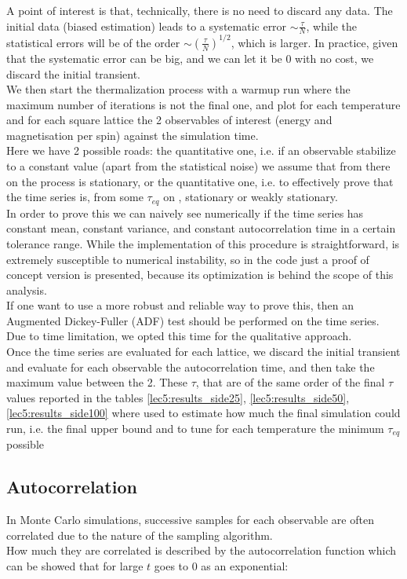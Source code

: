 A point of interest is that, technically, there is no need to discard any data. The initial data (biased estimation) leads to a systematic error $\sim \frac{\tau}{N}$,
while the statistical errors will be of the order $\sim (\frac{\tau}{N})^{1/2}$, which is larger. In practice, given that the systematic error can be big, 
and we can let it be 0 with no cost, we discard the initial transient. \\ 

We then start the thermalization process with a warmup run where the maximum number of iterations is not the final one, and plot for each temperature and for 
each square lattice the 2 observables of interest (energy and magnetisation per spin) against the simulation time. \\

Here we have 2 possible roads: the quantitative one, i.e. if an observable stabilize to a constant value (apart from the statistical noise) 
we assume that from there on the process is stationary, or the quantitative one, i.e. to effectively prove that the time series is, from some $\tau_{eq}$ on ,
stationary or weakly stationary. \\
In order to prove this we can naively see numerically if the time series has constant mean, constant variance, and constant autocorrelation time in a certain tolerance 
range. While the implementation of this procedure is straightforward, is extremely susceptible to numerical instability, 
so in the code just a proof of concept version is presented, because its optimization is behind the scope of this analysis. \\
If one want to use a more robust and reliable way to prove this, then an Augmented Dickey-Fuller (ADF) test should be performed on the time series. \\
Due to time limitation, we opted this time for the qualitative approach. \\

Once the time series are evaluated for each lattice, we discard the initial transient and evaluate for each observable the autocorrelation time, and then take the maximum value between the 2.
These $\tau$, that are of the same order of the final $\tau$ values reported in the tables \ref{lec5:results_side25}, \ref{lec5:results_side50}, \ref{lec5:results_side100} where used 
to estimate how much the final simulation could run, i.e. the final upper bound and to tune for each temperature the minimum $\tau_{eq}$ possible

\subsection{Autocorrelation} In Monte Carlo simulations, successive samples for each observable are often correlated due to the nature of the sampling algorithm. \\
How much they are correlated is described by the autocorrelation function which can be showed that for large $t$ goes to 0 as an exponential:

